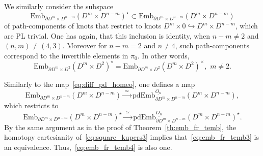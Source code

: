 \documentclass[11pt]{amsart}
\theoremstyle{definition}
\newcommand{\Emb}{\mathrm{Emb}}
\newcommand{\pdEmb}{\mathrm{pdEmb}}
\newcommand{\hofiber}{\mathrm{hofiber}}
\newcommand{\fiber}{\mathrm{fiber}}
\numberwithin{equation}{section}
\begin{document}
We similarly consider the subspace 
\[
\Emb_{\partial D^m\times D^{n-m}}(D^m\times D^{n-m})^\star\subset \Emb_{\partial D^m\times D^{n-m}}(D^m\times D^{n-m})
\]
of path-components of knots that restrict to knots $D^m\times 0\hookrightarrow D^m\times D^{n-m}$, which are PL trivial. One has again, that 
this inclusion is identity, when $n-m\neq 2$ and $(n,m)\neq (4,3)$. Moreover for $n-m=2$ and $n\neq 4$, such path-components correspond to the invertible elements in $\pi_0$. In other words,
\[
\Emb_{\partial D^m\times D^{2}}(D^m\times D^{2})^\star
=
\Emb_{\partial D^m\times D^{2}}(D^m\times D^{2})^\times,\,\, m\neq 2.
\]

Similarly to the map~\eqref{eq:diff_pd_homeo}, one defines a map
\begin{equation}\label{eq:emb_fr_temb3}
\Emb_{\partial D^m\times D^{n-m}}(D^m\times D^{n-m})\xrightarrow{\,\,\simeq\,\,} \pdEmb_{\partial D^m\times D^{n-m}}^{\underline{O_n}}(D^m\times
D^{n-m}),
\end{equation}
which restricts to
\begin{equation}\label{eq:emb_fr_temb4}
\Emb_{\partial D^m\times D^{n-m}}(D^m\times D^{n-m})^\star\xrightarrow{\,\,\simeq\,\,} \pdEmb_{\partial D^m\times D^{n-m}}^{\underline{O_n}}(D^m\times
D^{n-m})^\star.
\end{equation}
By the same argument as in the proof of Theorem~\ref{th:emb_fr_temb}, the homotopy cartesianity of~\eqref{eq:square_kupers3} implies that~\eqref{eq:emb_fr_temb3} is an equivalence. Thus,~\eqref{eq:emb_fr_temb4}  %
is also one. 
\end{document}
